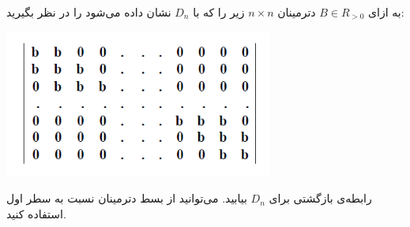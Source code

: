 \EXERCISE
به ازای
$B \in R_{>0}$
دترمینان
$n \times n$
زیر را که با
$D_n$
نشان داده می‌شود را در نظر بگیرید:
    \begin{center}
     	\includegraphics[scale=0.2]{./9.png}
    \end{center}
رابطه‌ی بازگشتی برای
$D_n$
بیابید. می‌توانید از بسط دترمینان نسبت به سطر اول استفاده کنید.